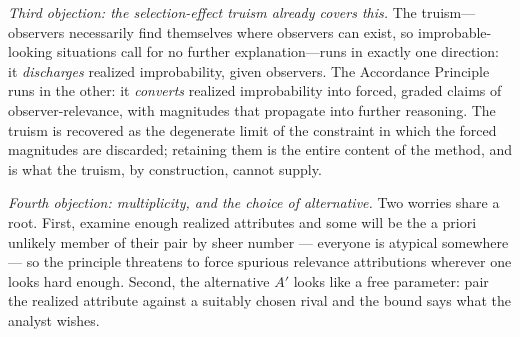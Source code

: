 \emph{Third objection: the selection-effect truism already covers this.} The truism---observers necessarily find themselves where observers can exist, so improbable-looking situations call for no further explanation---runs in exactly one direction: it \emph{discharges} realized improbability, given observers. The Accordance Principle runs in the other: it \emph{converts} realized improbability into forced, graded claims of observer-relevance, with magnitudes that propagate into further reasoning. The truism is recovered as the degenerate limit of the constraint in which the forced magnitudes are discarded; retaining them is the entire content of the method, and is what the truism, by construction, cannot supply.

\emph{Fourth objection: multiplicity, and the choice of alternative.} Two worries share a root. First, examine enough realized attributes and some will be the a priori unlikely member of their pair by sheer number --- everyone is atypical somewhere --- so the principle threatens to force spurious relevance attributions wherever one looks hard enough. Second, the alternative $A'$ looks like a free parameter: pair the realized attribute against a suitably chosen rival and the bound says what the analyst wishes.

